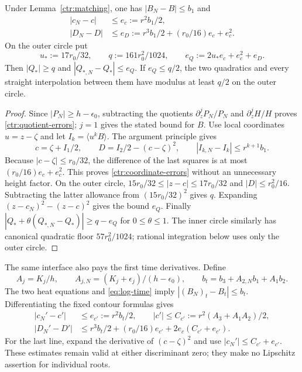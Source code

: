 \begin{proposition}
\label{ctr:coordinate-transfer}
Under Lemma~\ref{ctr:matching}, one has $|B_N-B|\le b_1$ and
\begin{equation}
 \begin{split}
 |c_N-c|&\le e_c:=r^2b_1/2,\\
 |D_N-D|&\le e_D:=r^3b_1/2+(r_0/16)e_c+e_c^2.
 \end{split}
 \label{ctr:coordinate-errors}
\end{equation}
On the outer circle put
\begin{equation}
 u_*:=17r_0/32,\qquad q:=161r_0^2/1024,
 \qquad e_Q:=2u_*e_c+e_c^2+e_D.
 \label{ctr:quadratic-errors}
\end{equation}
Then $|Q_*|\ge q$ and $|Q_{*,N}-Q_*|\le e_Q$. If
$e_Q\le q/2$, the two quadratics and every straight interpolation
between them have modulus at least $q/2$ on the outer circle.
\end{proposition}

\begin{proof}
Since $|P_N|\ge h-\epsilon_0$, subtracting the quotients
$\partial_z^jP_N/P_N$ and $\partial_z^jH/H$ proves
\eqref{ctr:quotient-errors}; $j=1$ gives the stated bound for $B$.
Use local coordinates $u=z-\zeta$ and let $I_k=\langle u^kB\rangle$.
The argument principle gives
\[
 c=\zeta+I_1/2,\qquad D=I_2/2-(c-\zeta)^2,
 \qquad |I_{k,N}-I_k|\le r^{k+1}b_1.
\]
Because $|c-\zeta|\le r_0/32$, the difference of the last squares
is at most $(r_0/16)e_c+e_c^2$. This proves
\eqref{ctr:coordinate-errors} without an unnecessary height factor.
On the outer circle,
$15r_0/32\le|z-c|\le17r_0/32$ and $|D|\le r_0^2/16$.
Subtracting the latter allowance from $(15r_0/32)^2$ gives $q$.
Expanding $(z-c_N)^2-(z-c)^2$ gives the bound $e_Q$.
Finally $|Q_*+\theta(Q_{*,N}-Q_*)|\ge q-e_Q$ for $0\le\theta\le1$.
The inner circle similarly has canonical quadratic floor
$57r_0^2/1024$; rational integration below uses only the outer circle.
\end{proof}

The same interface also pays the first time derivatives. Define
\begin{equation}
 A_j=K_j/h,\qquad A_{j,N}=(K_j+\epsilon_j)/(h-\epsilon_0),\qquad
 b_t=b_3+A_{2,N}b_1+A_1b_2.
 \label{ctr:time-quotient}
\end{equation}
The two heat equations and \eqref{eq:log-time} imply
$|(B_N)_t-B_t|\le b_t$. Differentiating the fixed contour formulas gives
\begin{equation}
 \begin{split}
 |c_N'-c'|&\le e_{c'}:=r^2b_t/2,\qquad
 |c'|\le C_{c'}:=r^2(A_3+A_1A_2)/2,\\
 |D_N'-D'|&\le r^3b_t/2+(r_0/16)e_{c'}
                           +2e_c(C_{c'}+e_{c'}).
 \end{split}
 \label{ctr:time-coordinate-errors}
\end{equation}
For the last line, expand the derivative of $(c-\zeta)^2$ and use
$|c_N'|\le C_{c'}+e_{c'}$. These estimates remain valid at either
discriminant zero; they make no Lipschitz assertion for individual roots.

